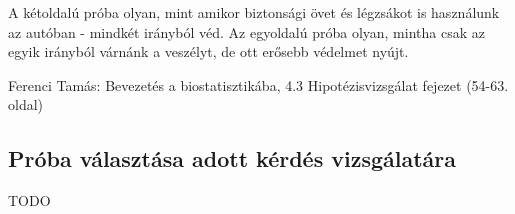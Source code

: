\documentclass[a4paper,12pt]{article}
\begin{document}
    A kétoldalú próba olyan, mint amikor biztonsági övet és légzsákot is használunk az autóban - mindkét irányból véd. Az egyoldalú próba olyan, mintha csak az egyik irányból várnánk a veszélyt, de ott erősebb védelmet nyújt.

    Ferenci Tamás: Bevezetés a biostatisztikába, 4.3 Hipotézisvizsgálat fejezet (54-63. oldal)

    \subsection{Próba választása adott kérdés vizsgálatára}
    TODO
\end{document}
